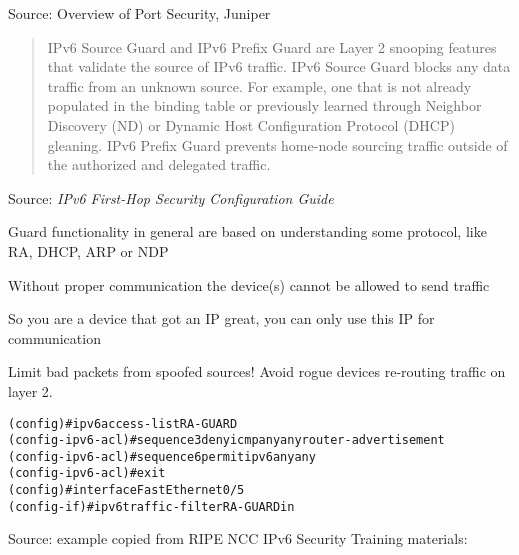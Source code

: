 \documentclass[Screen16to9,17pt]{foils}
\begin{document}
Source: Overview of Port Security, Juniper\\ {\small{}}



\begin{quote}
IPv6 Source Guard and IPv6 Prefix Guard are Layer 2 snooping features that validate the source of IPv6 traffic. IPv6 Source Guard blocks any data traffic from an unknown source. For example, one that is not already populated in the binding table or previously learned through Neighbor Discovery (ND) or Dynamic Host Configuration Protocol (DHCP) gleaning. IPv6 Prefix Guard prevents home-node sourcing traffic outside of the authorized and delegated traffic.
\end{quote}
Source: \emph{IPv6 First-Hop Security Configuration Guide}\\

\begin{list2}
\item Guard functionality in general are based on understanding some protocol, like RA, DHCP, ARP or NDP
\item Without proper communication the device(s) cannot be allowed to send traffic
\item So you are a device that got an IP great, you can only use this IP for communication
\end{list2}

Limit bad packets from spoofed sources! Avoid rogue devices re-routing traffic on layer 2.




\begin{alltt}
 (config)#ipv6 access-list RA-GUARD
 (config-ipv6-acl)#sequence 3 deny icmp any any router-advertisement
 (config-ipv6-acl)#sequence 6 permit ipv6 any any
 (config-ipv6-acl)#exit
 (config)#interface FastEthernet0/5
 (config-if)#ipv6 traffic-filter RA-GUARD in
\end{alltt}
Source: example copied from RIPE NCC IPv6 Security Training materials:\\
\end{document}
